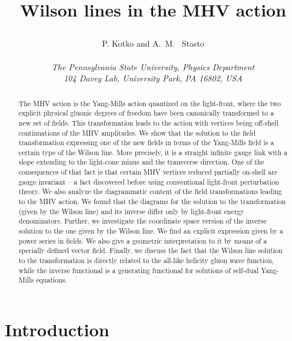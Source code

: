 \documentclass[english,american]{article}
\begin{document}
\title{Wilson lines in the MHV action\date{}}


\author{P. Kotko and A.~M.~ Stasto\\\\ \it\small The Pennsylvania State University,
Physics Department\\ \it\small 104 Davey Lab, University Park, PA
16802, USA}
\maketitle
\begin{abstract}
The MHV action is the Yang-Mills action quantized on the light-front,
where the  two explicit physical gluonic degrees of freedom have been
canonically transformed to a new set of fields. 
This transformation leads to the action with vertices being off-shell continuations of the MHV amplitudes.
We show that the solution to the field transformation expressing one
of the  new fields in terms of the Yang-Mills field is a certain
type of the Wilson line. More precisely, it is a straight infinite gauge link
with a slope extending to the light-cone minus and the transverse
direction. One of the consequences of that fact is that certain MHV
vertices reduced partially on-shell are gauge invariant -- a fact
discovered before using conventional light-front perturbation theory.
We  also analyze the diagrammatic content of the field transformations
leading to the MHV action. We found that the diagrams for the solution
to the transformation (given by the Wilson line) and its inverse differ
only by light-front energy denominators. Further, we investigate the coordinate
space version of the inverse solution to the one given by the Wilson
line. We find an explicit expression given by a power series in fields. We also
 give a geometric interpretation to it by means of a specially defined vector field. Finally, we discuss
the fact that the Wilson line solution to the transformation is directly
related to the all-like helicity gluon wave function, while the inverse
functional is a generating functional for solutions of self-dual
Yang-Mills equations.
\end{abstract}
\newpage 

\tableofcontents{}

\newpage 



\section{Introduction}
\end{document}
